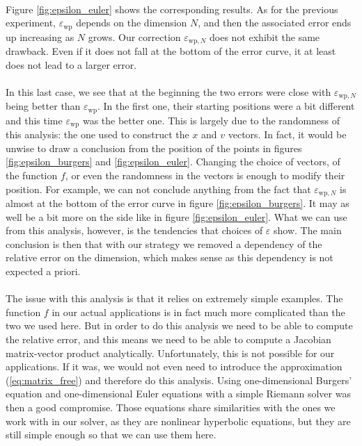       \paragraph{}
      Figure \ref{fig:epsilon_euler} shows the corresponding results.
      As for the previous experiment, $\varepsilon_\textrm{wp}$ depends on the dimension $N$, and then the associated error ends up increasing as $N$ grows.
      Our correction $\varepsilon_{\textrm{wp}, N}$ does not exhibit the same drawback.
      Even if it does not fall at the bottom of the error curve, it at least does not lead to a larger error.

      \paragraph{}
      In this last case, we see that at the beginning the two errors were close with $\varepsilon_{\textrm{wp}, N}$ being better than $\varepsilon_\textrm{wp}$.
      In the first one, their starting positions were a bit different and this time $\varepsilon_\textrm{wp}$ was the better one.
      This is largely due to the randomness of this analysis: the one used to construct the $x$ and $v$ vectors.
      In fact, it would be unwise to draw a conclusion from the position of the points in figures \ref{fig:epsilon_burgers} and \ref{fig:epsilon_euler}.
      Changing the choice of vectors, of the function $f$, or even the randomness in the vectors is enough to modify their position.
      For example, we can not conclude anything from the fact that $\varepsilon_{\textrm{wp}, N}$ is almost at the bottom of the error curve in figure \ref{fig:epsilon_burgers}.
      It may as well be a bit more on the side like in figure \ref{fig:epsilon_euler}.
      What we can use from this analysis, however, is the tendencies that choices of $\varepsilon$ show.
      The main conclusion is then that with our strategy we removed a dependency of the relative error on the dimension, which makes sense as this dependency is not expected a priori.

      \paragraph{}
      The issue with this analysis is that it relies on extremely simple examples.
      The function $f$ in our actual applications is in fact much more complicated than the two we used here.
      But in order to do this analysis we need to be able to compute the relative error, and this means we need to be able to compute a Jacobian matrix-vector product analytically.
      Unfortunately, this is not possible for our applications.
      If it was, we would not even need to introduce the approximation (\ref{eq:matrix_free}) and therefore do this analysis.
      Using one-dimensional Burgers' equation and one-dimensional Euler equations with a simple Riemann solver was then a good compromise.
      Those equations share similarities with the ones we work with in our solver, as they are nonlinear hyperbolic equations, but they are still simple enough so that we can use them here.


